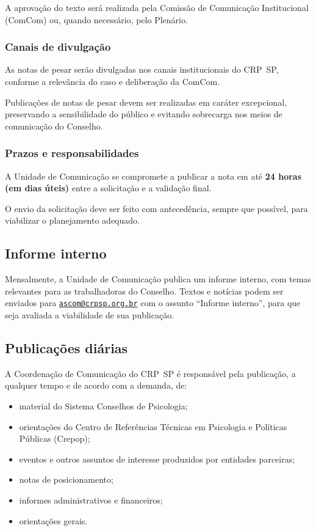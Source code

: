 A aprovação do texto será realizada pela Comissão de Comunicação
Institucional (ComCom) ou, quando necessário, pelo Plenário.

\subsubsection{Canais de divulgação}

As notas de pesar serão divulgadas nos canais institucionais do CRP~SP,
conforme a relevância do caso e deliberação da ComCom.

Publicações de notas de pesar devem ser realizadas em caráter
excepcional, preservando a sensibilidade do público e evitando
sobrecarga nos meios de comunicação do Conselho.

\subsubsection{Prazos e responsabilidades}

A Unidade de Comunicação se compromete a publicar a nota em até
\textbf{24 horas (em dias úteis)} entre a solicitação e a validação
final.

O envio da solicitação deve ser feito com antecedência, sempre que
possível, para viabilizar o planejamento adequado.

\subsection{Informe interno}

Mensalmente, a Unidade de Comunicação publica um informe interno, com
temas relevantes para as trabalhadoras do Conselho. Textos e notícias
podem ser enviados para
\href{mailto:ascom@crpsp.org.br}{\nolinkurl{ascom@crpsp.org.br}} com o
assunto ``Informe interno'', para que seja avaliada a viabilidade de sua
publicação.

\subsection{Publicações diárias}

A Coordenação de Comunicação do CRP~SP é responsável pela publicação, a
qualquer tempo e de acordo com a demanda, de:

\begin{itemize}
  \item
        material do Sistema Conselhos de Psicologia;
  \item
        orientações do Centro de Referências Técnicas em Psicologia e
        Políticas Públicas (Crepop);
  \item
        eventos e outros assuntos de interesse produzidos por entidades
        parceiras;
  \item
        notas de posicionamento;
  \item
        informes administrativos e financeiros;
  \item
        orientações gerais.
\end{itemize}

